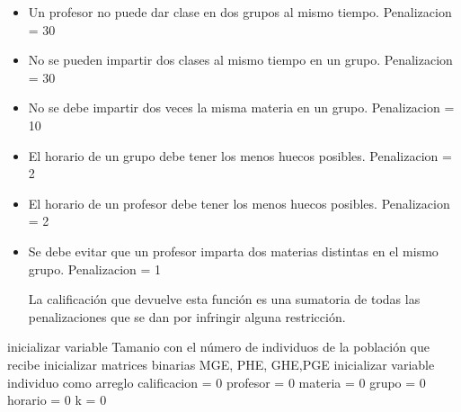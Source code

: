\begin{itemize}
	\item Un profesor no puede dar clase en dos grupos al mismo tiempo. Penalizacion = 30
	
	\item No se pueden impartir dos clases al mismo tiempo en un grupo. Penalizacion = 30
	
	\item No se debe impartir dos veces la misma materia en un grupo. Penalizacion = 10
	
	\item El horario de un grupo debe tener los menos huecos posibles. Penalizacion = 2
	
	\item El horario de un profesor debe tener los menos huecos posibles. Penalizacion = 2
	
	\item Se debe evitar que un profesor imparta dos materias distintas en el mismo grupo. Penalizacion = 1
	
	La calificación que devuelve esta función es una sumatoria de todas las penalizaciones que se dan por infringir alguna restricción.
	
\end{itemize}


\begin{algorithm}[H]
	\DontPrintSemicolon
	\SetAlgoLined
	\SetAlgoLined
	
	inicializar variable Tamanio con el n\'umero de individuos de la poblaci\'on que recibe\;
	inicializar matrices binarias MGE, PHE, GHE,PGE\;
	inicializar variable individuo como arreglo\;
	calificacion = 0\;
	profesor = 0\;
	materia = 0\;
	grupo = 0\;
	horario = 0\;
	k = 0\;
	\SetAlgoVlined {}
\end{algorithm}

